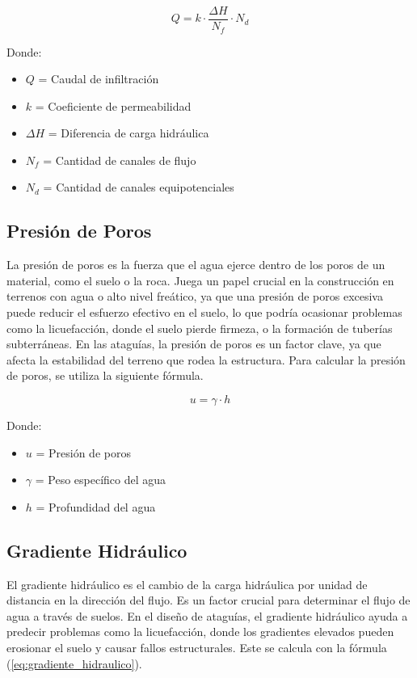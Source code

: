 \begin{equation}
    Q = k \cdot \frac{\Delta H}{N_{f}} \cdot N_{d}
    \label{eq:caudal_infiltracion}
\end{equation}

Donde:
\begin{itemize}
    \item $Q$ = Caudal de infiltración
    \item $k$ = Coeficiente de permeabilidad
    \item $\Delta H$ = Diferencia de carga hidráulica
    \item $N_{f}$ = Cantidad de canales de flujo
    \item $N_{d}$ = Cantidad de canales equipotenciales
\end{itemize}

\subsection{Presión de Poros}
La presión de poros es la fuerza que el agua ejerce dentro de los poros de un material, como el suelo o la roca. Juega un papel crucial en la construcción en terrenos con agua o alto nivel freático, ya que una presión de poros excesiva puede reducir el esfuerzo efectivo en el suelo, lo que podría ocasionar problemas como la licuefacción, donde el suelo pierde firmeza, o la formación de tuberías subterráneas. En las ataguías, la presión de poros es un factor clave, ya que afecta la estabilidad del terreno que rodea la estructura. Para calcular la presión de poros, se utiliza la siguiente fórmula. \textbf{\cite{jeas}}

\begin{equation}
    u = \gamma \cdot h
    \label{eq:presion_poros}
\end{equation}

Donde:
\begin{itemize}
    \item $u$ = Presión de poros
    \item $\gamma$ = Peso específico del agua
    \item $h$ = Profundidad del agua
\end{itemize}

\subsection{Gradiente Hidráulico}
El gradiente hidráulico es el cambio de la carga hidráulica por unidad de distancia en la dirección del flujo. Es un factor crucial para determinar el flujo de agua a través de suelos. En el diseño de ataguías, el gradiente hidráulico ayuda a predecir problemas como la licuefacción, donde los gradientes elevados pueden erosionar el suelo y causar fallos estructurales. Este se calcula con la fórmula (\ref{eq:gradiente_hidraulico}). \textbf{\cite{budhu_soil_2010}}

